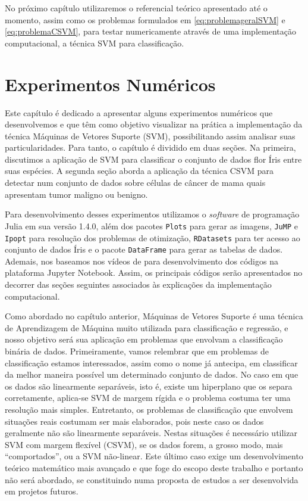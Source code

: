 \documentclass[12pt,a4paper]{scrartcl}
\theoremstyle{definition}%
\begin{document}
No próximo capítulo utilizaremos o referencial teórico apresentado até o momento, assim como os problemas formulados em \eqref{eq:problemageralSVM} e \eqref{eq:problemaCSVM}, para testar numericamente através de uma implementação computacional, a técnica SVM para classificação.

\newpage
\section{Experimentos Numéricos} \label{chap:experimentos_numericos}


Este capítulo é dedicado a apresentar alguns experimentos numéricos que desenvolvemos e que têm como
objetivo visualizar na prática a implementação da técnica Máquinas de
Vetores Suporte (SVM), possibilitando assim analisar suas particularidades. Para tanto, o capítulo é dividido em
duas seções. Na primeira, discutimos a aplicação de SVM para classificar
o conjunto de dados flor Íris entre suas espécies. A segunda seção
aborda a aplicação da técnica CSVM para detectar num conjunto de dados
sobre células de câncer de mama quais apresentam tumor maligno ou
benigno.

Para desenvolvimento desses experimentos utilizamos o \emph{software} de
programação Julia em sua versão 1.4.0, além dos pacotes \texttt{Plots}
para gerar as imagens, \texttt{JuMP} e \texttt{Ipopt} para resolução dos
problemas de otimização, \texttt{RDatasets} para ter acesso ao conjunto
de dados Íris e o pacote \texttt{DataFrame} para gerar as tabelas de
dados. Ademais, nos baseamos nos vídeos de \textcite{AbelSVM1,AbelSVM2} para desenvolvimento dos códigos na plataforma Jupyter Notebook. Assim, os principais códigos serão apresentados no decorrer das seções seguintes associados às explicações da implementação computacional.

Como abordado no capítulo anterior, Máquinas de Vetores Suporte é uma
técnica de Aprendizagem de Máquina muito utilizada para classificação e
regressão, e nosso objetivo será sua aplicação em problemas que envolvam
a classificação binária de dados. Primeiramente, vamos relembrar que em
problemas de classificação estamos interessados, assim como o nome já
antecipa, em classificar da melhor maneira possível um determinado
conjunto de dados. No caso em que os dados são linearmente separáveis,
isto é, existe um hiperplano que os separa corretamente, aplica-se SVM
de margem rígida e o problema costuma ter uma resolução mais simples.
Entretanto, os problemas de classificação que envolvem situações reais
costumam ser mais elaborados, pois neste caso os dados geralmente não
são linearmente separáveis. Nestas situações é necessário utilizar SVM
com margem flexível (CSVM), se os dados forem, a grosso modo, mais
``comportados'', ou a SVM não-linear. Este último caso exige um
desenvolvimento teórico matemático mais avançado e que foge do escopo
deste trabalho e portanto não será abordado, se constituindo numa
proposta de estudos a ser desenvolvida em projetos futuros.
\end{document}
